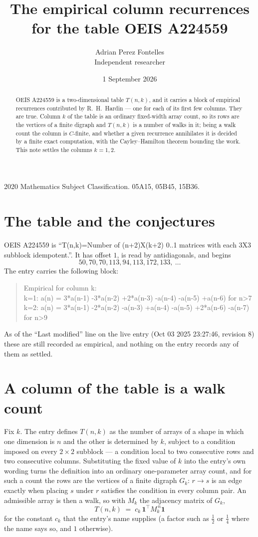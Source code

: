 \documentclass[11pt,a4paper]{article}
\title{The empirical column recurrences for the table OEIS A224559}
\author{Adrian Perez Fontelles\\ \small Independent researcher}
\date{1 September 2026}
\theoremstyle{plain}
\theoremstyle{definition}
\begin{document}
\maketitle

\begin{abstract}
OEIS A224559 is a two-dimensional table $T(n,k)$, and it carries a block of empirical
recurrences contributed by R.~H.~Hardin --- one for each of its first few columns. They are
true. Column $k$ of the table is an ordinary fixed-width array count, so its rows are the
vertices of a finite digraph and $T(n,k)$ is a number of walks in it; being a walk count the
column is $C$-finite, and whether a given recurrence annihilates it is decided by a finite
exact computation, with the Cayley--Hamilton theorem bounding the work. This note settles the columns $k=1, 2$.
\end{abstract}

\noindent\small 2020 Mathematics Subject Classification. 05A15, 05B45, 15B36.\normalsize

\section{The table and the conjectures}

OEIS A224559 is ``T(n,k)=Number of (n+2)X(k+2) 0..1 matrices with each 3X3 subblock idempotent.''. It has offset $1$, is
read by antidiagonals, and begins
\[
50, 70, 70, 113, 94, 113, 172, 133,\ \dots
\]
The entry carries the following block:
\begin{quote}\small
Empirical for column k:\\
k=1: a(n) = 3*a(n-1) -3*a(n-2) +2*a(n-3) -a(n-4) -a(n-5) +a(n-6) for n>7\\
k=2: a(n) = 3*a(n-1) -2*a(n-2) -a(n-3) +a(n-4) -a(n-5) +2*a(n-6) -a(n-7) for n>9\\
\end{quote}
As of the ``Last modified'' line on the live entry (Oct 03 2025 23:27:46, revision 8) these are still
recorded as empirical, and nothing on the entry records any of them as settled.

\section{A column of the table is a walk count}

Fix $k$. The entry defines $T(n,k)$ as the number of arrays of a shape in which one dimension
is $n$ and the other is determined by $k$, subject to a condition imposed on every
$2\times2$ subblock --- a condition local to two consecutive rows and two consecutive columns.
Substituting the fixed value of $k$ into the entry's own wording turns the definition into an
ordinary one-parameter array count, and for such a count the rows are the vertices of a finite
digraph $G_k$: $r\to s$ is an edge exactly when placing $s$ under $r$ satisfies the condition
in every column pair. An admissible array is then a walk, so with $M_k$ the adjacency matrix
of $G_k$,
\[
T(n,k)\;=\;c_k\,\mathbf{1}^{\!\top}M_k^{\,n}\mathbf{1}
\]
for the constant $c_k$ that the entry's name supplies (a factor such as $\tfrac12$ or
$\tfrac14$ where the name says so, and $1$ otherwise).
\end{document}
